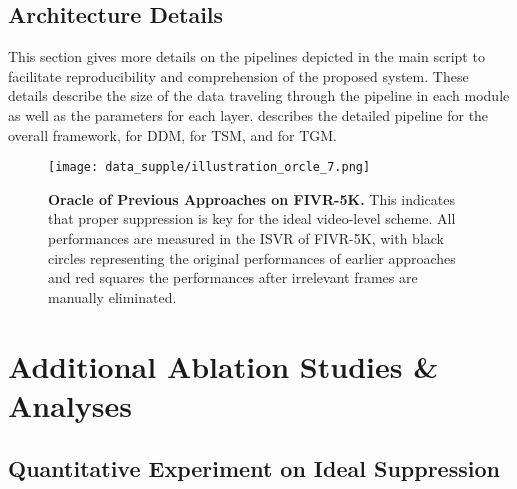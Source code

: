 \documentclass[10pt,twocolumn,letterpaper]{article}
\begin{document}
    \subsection{Architecture Details}\label{arch}
        This section gives more details on the pipelines depicted in the main script to facilitate reproducibility and comprehension of the proposed system. These details describe the size of the data traveling through the pipeline in each module as well as the parameters for each layer.
         describes the detailed pipeline for the overall framework,  for DDM,  for TSM, and  for TGM.
    
         
   
        \begin{figure}[!t]
            \centering
            \texttt{[image: data\_supple/illustration\_orcle\_7.png]} 
            \caption{\textbf{Oracle of Previous Approaches on FIVR-5K.} This indicates that proper suppression is key for the ideal video-level scheme. All performances are measured in the ISVR of FIVR-5K, with black circles representing the original performances of earlier approaches and red squares the performances after irrelevant frames are manually eliminated. \vspace{-0mm}} \label{fig:oracle}
        \end{figure}
        
\section{Additional Ablation Studies \& Analyses}\label{ablation_analyses}
    \subsection{Quantitative Experiment on Ideal Suppression}\label{quan_exp}
        
\end{document}
